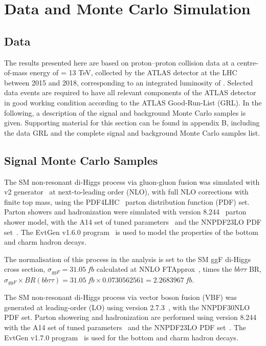 

\section{Data and Monte Carlo Simulation}
\subsection{Data}
The results presented here are based on proton–proton collision data 
at a centre-of-mass energy of \sqrts = 13 TeV, 
collected by the ATLAS detector at the LHC between 2015 and 2018, 
corresponding to an integrated luminosity of \lumi. 
Selected data events are required to have all relevant components 
of the ATLAS detector in good working condition 
according to the ATLAS Good-Run-List (GRL). 
In the following, a description of the signal and 
background Monte Carlo samples is given. 
Supporting material for this section can be found in appendix B, 
including the data GRL and the complete signal and background Monte Carlo samples list.
 
 \subsection{Signal Monte Carlo Samples}


 The SM non-resonant di-Higgs process via gluon-gluon fusion 
 was simulated with \POWHEGBOX v2 generator~\cite{Powheg1, Powheg2, Powheg3} 
 at next-to-leading order (NLO), with full NLO corrections with finite top mass, 
 using the PDF4LHC~\cite{Butterworth:2015oua} parton distribution function (PDF) set. 
 Parton showers and hadronization were simulated with  version 8.244~\cite{PYTHIA82} 
 parton shower model, with the A14 set of tuned parameters~\cite{A14tune, ATLAS:2012uec} 
 and the NNPDF23LO PDF set~\cite{NNPDF23PDFSet}. 
 The EvtGen v1.6.0 program~\cite{EvtGen} is used to model 
 the properties of the bottom and charm hadron decays.

 The normalisation of this process in the analysis is set to the SM ggF di-Higgs cross section, $\sigma_{ggF}=\SI{31.05}{fb}$ calculated at NNLO FTApprox~\cite{Grazzini:2018bsd}, times the $bb\tau\tau$ BR, $\sigma_{ggF} \times BR (bb \tau\tau)  = \SI{31.05}{fb} \times 0.0730562561  =  \SI{2.2683967}{fb}$.  
 
 The SM non-resonant di-Higgs process via vector boson fusion (VBF) was generated at leading-order (LO) using \MADGRAPH version 2.7.3~\cite{mg5_lo}, with the NNPDF30NLO~\cite{NNPDF} PDF set. Parton showering and hadronization are performed using  version 8.244~\cite{PYTHIA82} with the A14 set of tuned parameters~\cite{A14tune, ATLAS:2012uec} and the NNPDF23LO PDF set~\cite{NNPDF23PDFSet}. The EvtGen  v1.7.0 program~\cite{EvtGen} is used for the bottom and charm hadron decays.
 
